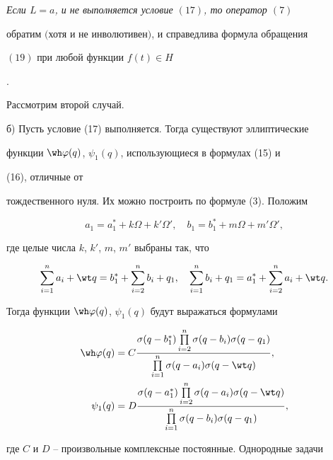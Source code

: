 {\it Если $L=a$, и не выполняется условие $(17)$, то оператор $(7)$ 


обратим $($хотя и не инволю\-ти\-вен$)$, и справедлива формула обращения 


$(19)$ при любой функции $f(t)\in H$}. 


 


Рассмотрим второй случай. 


 


б) Пусть условие (17) выполняется. Тогда существуют эллиптические 


функции $\wh\varphi(q)$, $\psi_1(q)$, использующиеся в формулах (15) и 


(16), отличные от 


тождественного нуля. Их можно построить по формуле (3). Положим 


$$ 


a_1=a^*_1+k\Omega+k'\Omega',\quad 


b_1=b^*_1+m\Omega+m'\Omega', 


$$ 


где целые числа $k$, $k'$, $m$, $m'$ выбраны так, что 


$$ 


\sum^n_{i=1}a_i+\wt q=b^*_1+\sum^n_{i=2}b_i+q_1,\quad 


\sum^n_{i=1}b_i+q_1=a^*_1+\sum^n_{i=2}a_i+\wt q. 


$$ 


Тогда функции $\wh\varphi(q)$, $\psi_1(q)$ будут выражаться формулами


\begin{align} 


\wh\varphi(q)&=C 


\frac{\sigma(q-b^*_1)\prod\limits^n_{i=2} 


\sigma(q-b_i)\sigma(q-q_1)} 


{\prod\limits^n_{i=1}\sigma(q-a_i)\sigma(q-\wt q)}, \\ 


% 


\psi_1(q)&=D 


\frac{\sigma(q-a^*_1)\prod\limits^n_{i=2} 


\sigma(q-a_i)\sigma(q-\wt q)} 


{\prod\limits^n_{i=1}\sigma(q-b_i)\sigma(q-q_1)},\end{align} 


где $C$ и $D$ -- произвольные комплексные постоянные. Однородные задачи 


